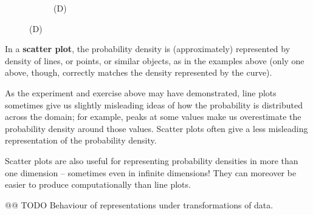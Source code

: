 \documentclass[
  a4paper,
  DIV=11,
  numbers=noendperiod,
  oneside]{scrreprt}
\begin{document}
\begin{figure}
\begin{tcolorbox}
\begin{figure}[H]
\begin{minipage}[t]{0.50\linewidth}
{\centering 


\caption{(D)}

}

\end{minipage}%

\end{figure}

\end{tcolorbox}

\end{figure}

In a {\textbf{scatter plot}}, the probability density is (approximately)
represented by density of lines, or points, or similar objects, as in
the examples above (only one above, though, correctly matches the
density represented by the curve).

As the experiment and exercise above may have demonstrated, line plots
sometimes give us slightly misleading ideas of how the probability is
distributed across the domain; for example, peaks at some values make us
overestimate the probability density around those values. Scatter plots
often give a less misleading representation of the probability density.

Scatter plots are also useful for representing probability densities in
more than one dimension -- sometimes even in infinite dimensions! They
can moreover be easier to produce computationally than line plots.

@@ TODO Behaviour of representations under transformations of data.
\end{document}
